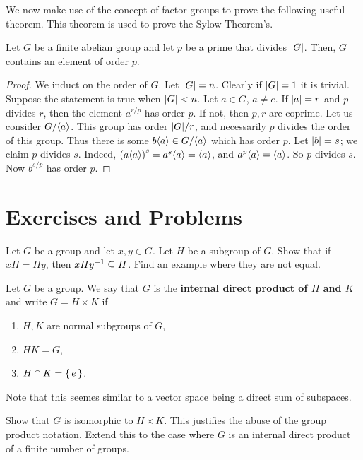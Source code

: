 \documentclass[./main.tex]{subfiles}
\begin{document}
We now make use of the concept of factor groups to prove the following useful
theorem. This theorem is used to prove the Sylow Theorem's.
\begin{theorem}
\label{thm:cauchy-thm-fin-abelian}
    Let $G$ be a finite abelian group and let $p$ be a prime that divides $\abs
    G$. Then, $G$ contains an element of order $p$.
\end{theorem}
\begin{proof}
    We induct on the order of $G$. Let $\abs G = n$. Clearly if $\abs G = 1$ it
    is trivial. Suppose the statement is true when $\abs G < n$. Let $a \in G$,
    $a \neq e$. If $\abs a = r$ and $p$ divides $r$, then the element $a^{r/p}$
    has order $p$. If not, then $p, r$ are coprime. Let us consider $G/{ \langle a \rangle }$.
    This group has order $\abs G / r$, and necessarily $p$ divides the order of
    this group. Thus there is some $b { \langle a \rangle } \in G/{ \langle a \rangle }$ which has order $p$.
    Let $\abs b = s$; we claim $p$ divides $s$. Indeed, $\paren{a \gen{a}}^s =
    a^s \gen a = \gen a$, and $a^p { \langle a \rangle } = { \langle a \rangle }$. So $p$ divides $s$. Now
    $b^{s/p}$ has order $p$.
\end{proof}

\section{Exercises and Problems}

\begin{exercise}
    Let $G$ be a group and let $x, y \in G$. Let $H$ be a subgroup of $G$. Show
    that if $xH = Hy$, then $xHy^{-1} \subseteq H$. Find an example where they
    are not equal.
\end{exercise}

\begin{exercise}
\label{ex:internal-direct-products}
    Let $G$ be a group. We say that $G$ is the \textbf{internal direct product
    of $H$ and $K$} and write $G = H \times K$ if
    \begin{enumerate}
        \item $H, K$ are normal subgroups of $G$,
        \item $HK = G$,
        \item $H \cap K = \set{e}$.
    \end{enumerate}
    Note that this seemes similar to a vector space being a direct sum of
    subspaces. 

    Show that $G$ is isomorphic to $H \times K$. This justifies the abuse of the
    group product notation. Extend this to the case where $G$ is an internal
    direct product of a finite number of groups.
\end{exercise}
\end{document}

